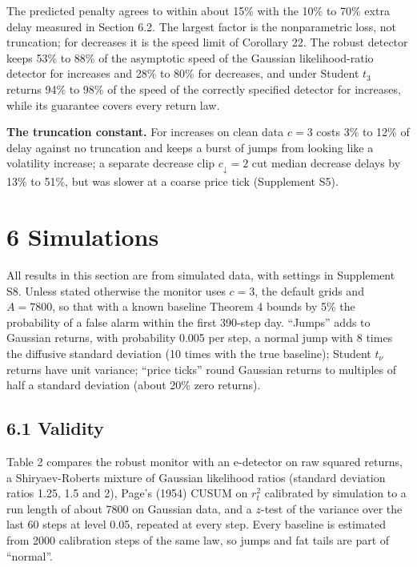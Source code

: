 \documentclass[
]{article}
\begin{document}
The predicted penalty agrees to within about 15\% with the 10\% to 70\%
extra delay measured in Section 6.2. The largest factor is the
nonparametric loss, not truncation; for decreases it is the speed limit
of Corollary 22. The robust detector keeps 53\% to 88\% of the
asymptotic speed of the Gaussian likelihood-ratio detector for increases
and 28\% to 80\% for decreases, and under Student \(t_3\) returns 94\%
to 98\% of the speed of the correctly specified detector for increases,
while its guarantee covers every return law.

\textbf{The truncation constant.} For increases on clean data \(c = 3\)
costs 3\% to 12\% of delay against no truncation and keeps a burst of
jumps from looking like a volatility increase; a separate decrease clip
\(c_{\downarrow} = 2\) cut median decrease delays by 13\% to 51\%, but
was slower at a coarse price tick (Supplement S5).

\hypertarget{simulations}{%
\section{6 Simulations}\label{simulations}}

All results in this section are from simulated data, with settings in
Supplement S8. Unless stated otherwise the monitor uses \(c = 3\), the
default grids and \(A = 7800\), so that with a known baseline Theorem 4
bounds by 5\% the probability of a false alarm within the first 390-step
day. ``Jumps'' adds to Gaussian returns, with probability 0.005 per
step, a normal jump with 8 times the diffusive standard deviation (10
times with the true baseline); Student \(t_\nu\) returns have unit
variance; ``price ticks'' round Gaussian returns to multiples of half a
standard deviation (about 20\% zero returns).

\hypertarget{validity-1}{%
\subsection{6.1 Validity}\label{validity-1}}

Table 2 compares the robust monitor with an e-detector on raw squared
returns, a Shiryaev-Roberts mixture of Gaussian likelihood ratios
(standard deviation ratios 1.25, 1.5 and 2), Page's (1954) CUSUM on
\(r_t^2\) calibrated by simulation to a run length of about 7800 on
Gaussian data, and a \(z\)-test of the variance over the last 60 steps
at level 0.05, repeated at every step. Every baseline is estimated from
2000 calibration steps of the same law, so jumps and fat tails are part
of ``normal''.
\end{document}
